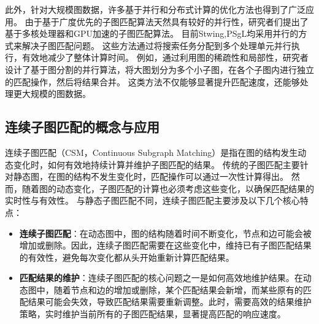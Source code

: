 此外，针对大规模图数据，许多基于并行和分布式计算的优化方法也得到了广泛应用。
由于基于广度优先的子图匹配算法天然具有较好的并行性，研究者们提出了基于多核处理器和GPU加速的子图匹配算法。
目前Stwing\cite{sm-stwing-DBLP:journals/pvldb/SunWWSL12},PSgL\cite{sm-psgl-DBLP:conf/sigmod/ShaoCCMYX14}均采用并行的方式来解决子图匹配问题。
这些方法通过将搜索任务分配到多个处理单元并行执行，有效地减少了整体计算时间。
例如，通过利用图的稀疏性和局部性，研究者设计了基于图分割的并行算法，将大图划分为多个小子图，在各个子图内进行独立的匹配操作，然后将结果合并。
这类方法不仅能够显著提升匹配速度，还能够处理更大规模的图数据。


\subsection{连续子图匹配的概念与应用}
连续子图匹配（CSM，Continuous Subgraph Matching）是指在图的结构发生动态变化时，如何有效地持续计算并维护子图匹配的结果。
传统的子图匹配主要针对静态图，在图的结构不发生变化时，匹配操作可以通过一次性计算得出。
然而，随着图的动态变化，子图匹配的计算也必须考虑这些变化，以确保匹配结果的实时性与有效性。
与静态子图匹配不同，连续子图匹配主要涉及以下几个核心特点：
\begin{itemize}
   \item \textbf{连续子图匹配}：在动态图中，图的结构随着时间不断变化，节点和边可能会被增加或删除。因此，连续子图匹配需要在这些变化中，维持已有子图匹配结果的有效性，避免每次变化都从头开始重新计算匹配结果。
   \item \textbf{匹配结果的维护}：连续子图匹配的核心问题之一是如何高效地维护结果。在动态图中，随着节点和边的增加或删除，某个匹配结果会新增，而某些原有的匹配结果可能会失效，导致匹配结果需要重新调整。此时，需要高效的结果维护策略，实时维护当前所有的子图匹配结果，显著提高匹配的响应速度。
\end{itemize}

